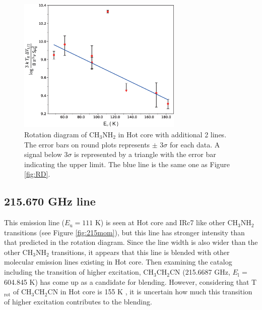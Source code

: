 \begin{figure}[htp]
  \centering
  \includegraphics[width=0.7\textwidth]{OrionKL/RD_blend.eps}
  \caption{Rotation diagram of CH$_{3}$NH$_{2}$ in Hot core with additional 2 lines. The error bars on round plots represents $\pm$ 3$\sigma$ for each data. A signal below 3$\sigma$ is represented by a triangle with the error bar indicating the upper limit. The blue line is the same one as Figure \ref{fig:RD}.}
  \label{fig:RD_blend}
\end{figure}

\subsection*{215.670 GHz line}
This emission line ($E_{\mathrm{u}}=111$ K) is seen at Hot core and IRc7 like other CH$_{3}$NH$_{2}$ transitions 
(see Figure \ref{fig:215mom}), but this line has stronger intensity than that predicted in the rotation diagram.
Since the line width is also wider than the other CH$_{3}$NH$_{2}$ transitions, 
it appears that this line is blended with other molecular emission lines existing in Hot core.
Then examining the catalog including the transition of higher excitation, CH$_3$CH$_2$CN (215.6687 GHz, $E_{\mathrm{l}}$ = 604.845 K)
has come up as a candidate for blending.
However, considering that T$_{\mathrm{rot}}$ of CH$_3$CH$_2$CN in Hot core is 155 K \citep{Feng+2015}, 
it is uncertain how much this transition of higher excitation contributes to the blending.

